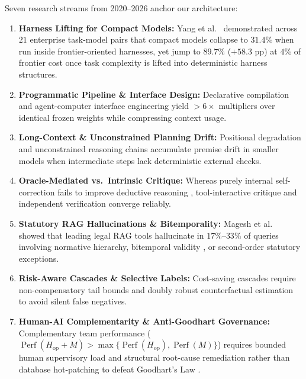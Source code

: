 \documentclass[10pt,twocolumn]{article}
\begin{document}
Seven research streams from 2020--2026 anchor our architecture:
\begin{enumerate}[leftmargin=*,nosep]
  \item \textbf{Harness Lifting for Compact Models:} Yang et al.\ \cite{yang2026better} demonstrated across $21$ enterprise task-model pairs that compact models collapse to $31.4\%$ when run inside frontier-oriented harnesses, yet jump to $89.7\%$ ($+58.3$ pp) at $4\%$ of frontier cost once task complexity is lifted into deterministic harness structures.
  \item \textbf{Programmatic Pipeline \& Interface Design:} Declarative compilation \cite{khattab2024dspy} and agent-computer interface engineering \cite{jimenez2024swebench,yang2024sweagent} yield $>6\times$ multipliers over identical frozen weights while compressing context usage.
  \item \textbf{Long-Context \& Unconstrained Planning Drift:} Positional degradation \cite{liu2024lost} and unconstrained reasoning chains accumulate premise drift in smaller models when intermediate steps lack deterministic external checks.
  \item \textbf{Oracle-Mediated vs.\ Intrinsic Critique:} Whereas purely internal self-correction fails to improve deductive reasoning \cite{huang2024large}, tool-interactive critique \cite{gou2024critic} and independent verification \cite{du2024improving} converge reliably.
  \item \textbf{Statutory RAG Hallucinations \& Bitemporality:} Magesh et al.\ \cite{magesh2025hallucination} showed that leading legal RAG tools hallucinate in $17\%$--$33\%$ of queries involving normative hierarchy, bitemporal validity \cite{jensen1999temporal,kulkarni2012temporal}, or second-order statutory exceptions.
  \item \textbf{Risk-Aware Cascades \& Selective Labels:} Cost-saving cascades \cite{chen2023frugalgpt,ong2025routellm} require non-compensatory tail bounds and doubly robust counterfactual estimation \cite{lakkaraju2017selective,robins1994estimation} to avoid silent false negatives.
  \item \textbf{Human-AI Complementarity \& Anti-Goodhart Governance:} Complementary team performance ($\operatorname{Perf}(H_{\mathrm{op}}+M) > \max\{\operatorname{Perf}(H_{\mathrm{op}}),\operatorname{Perf}(M)\}$) requires bounded human supervisory load \cite{parasuraman2000model,amershi2019guidelines,wilder2020learning,bansal2021does} and structural root-cause remediation rather than database hot-patching to defeat Goodhart's Law \cite{goodhart1975problems,strathern1997improving}.
\end{enumerate}
\end{document}
